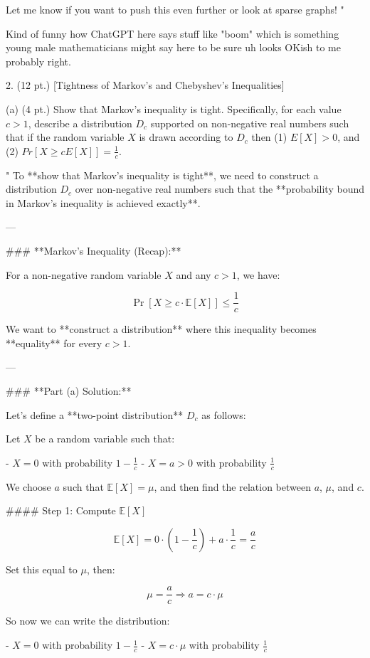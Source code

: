 Let me know if you want to push this even further or look at sparse graphs!
"

Kind of funny how ChatGPT here says stuff like "boom" which is something young male mathematicians might say here to be sure uh looks OKish to me probably right.

2. (12 pt.) [Tightness of Markov's and Chebyshev's Inequalities]

(a) (4 pt.) Show that Markov's inequality is tight. Specifically, for each value $c > 1$, describe a distribution $D_c$ supported on non-negative real numbers such that if the random variable $X$ is drawn according to $D_c$ then
(1) $E[X] > 0$, and
(2) $Pr[X \ge cE[X]] = \frac{1}{c}$.

"
To **show that Markov's inequality is tight**, we need to construct a distribution \( D_c \) over non-negative real numbers such that the **probability bound in Markov's inequality is achieved exactly**.

---

### **Markov's Inequality (Recap):**

For a non-negative random variable \( X \) and any \( c > 1 \), we have:

\[
\Pr[X \ge c \cdot \mathbb{E}[X]] \le \frac{1}{c}
\]

We want to **construct a distribution** where this inequality becomes **equality** for every \( c > 1 \).

---

### **Part (a) Solution:**

Let's define a **two-point distribution** \( D_c \) as follows:

Let \( X \) be a random variable such that:

- \( X = 0 \) with probability \( 1 - \frac{1}{c} \)
- \( X = a > 0 \) with probability \( \frac{1}{c} \)

We choose \( a \) such that \( \mathbb{E}[X] = \mu \), and then find the relation between \( a \), \( \mu \), and \( c \).

#### Step 1: Compute \( \mathbb{E}[X] \)

\[
\mathbb{E}[X] = 0 \cdot \left(1 - \frac{1}{c}\right) + a \cdot \frac{1}{c} = \frac{a}{c}
\]

Set this equal to \( \mu \), then:

\[
\mu = \frac{a}{c} \Rightarrow a = c \cdot \mu
\]

So now we can write the distribution:

- \( X = 0 \) with probability \( 1 - \frac{1}{c} \)
- \( X = c \cdot \mu \) with probability \( \frac{1}{c} \)

